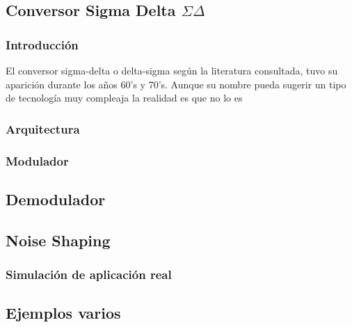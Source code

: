 



\subsection{Conversor Sigma Delta $\Sigma \Delta$}

\subsubsection{Introducción}
El conversor sigma-delta o delta-sigma según la literatura consultada, tuvo su aparición durante los años 60's y 70's. Aunque su nombre pueda sugerir un tipo de tecnología muy compleaja la realidad es que no lo es


\subsubsection{Arquitectura}

\subsubsection{Modulador}

\subsection{Demodulador}

\subsection{Noise Shaping}

\subsubsection{Simulación de aplicación real}

\subsection{Ejemplos varios}

